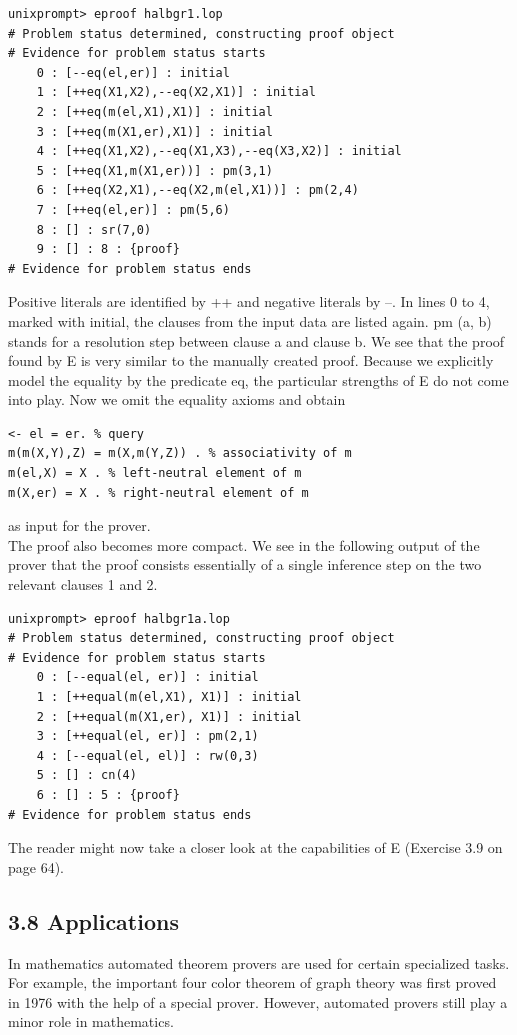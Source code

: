 \documentclass[10pt]{book}
\begin{document}
\begin{verbatim}
unixprompt> eproof halbgr1.lop
# Problem status determined, constructing proof object
# Evidence for problem status starts
    0 : [--eq(el,er)] : initial
    1 : [++eq(X1,X2),--eq(X2,X1)] : initial
    2 : [++eq(m(el,X1),X1)] : initial
    3 : [++eq(m(X1,er),X1)] : initial
    4 : [++eq(X1,X2),--eq(X1,X3),--eq(X3,X2)] : initial
    5 : [++eq(X1,m(X1,er))] : pm(3,1)
    6 : [++eq(X2,X1),--eq(X2,m(el,X1))] : pm(2,4)
    7 : [++eq(el,er)] : pm(5,6)
    8 : [] : sr(7,0)
    9 : [] : 8 : {proof}
# Evidence for problem status ends
\end{verbatim}

Positive literals are identified by ++ and negative literals by --. In lines 0 to 4, marked with initial, the clauses from the input data are listed again. pm (a, b) stands for a resolution step between clause a and clause b. We see that the proof found by E is very similar to the manually created proof. Because we explicitly model the equality by the predicate eq, the particular strengths of E do not come into play. Now we omit the equality axioms and obtain

\begin{verbatim}
<- el = er. % query
m(m(X,Y),Z) = m(X,m(Y,Z)) . % associativity of m
m(el,X) = X . % left-neutral element of m
m(X,er) = X . % right-neutral element of m
\end{verbatim}

as input for the prover.\\
The proof also becomes more compact. We see in the following output of the prover that the proof consists essentially of a single inference step on the two relevant clauses 1 and 2.

\begin{verbatim}
unixprompt> eproof halbgr1a.lop
# Problem status determined, constructing proof object
# Evidence for problem status starts
    0 : [--equal(el, er)] : initial
    1 : [++equal(m(el,X1), X1)] : initial
    2 : [++equal(m(X1,er), X1)] : initial
    3 : [++equal(el, er)] : pm(2,1)
    4 : [--equal(el, el)] : rw(0,3)
    5 : [] : cn(4)
    6 : [] : 5 : {proof}
# Evidence for problem status ends
\end{verbatim}

The reader might now take a closer look at the capabilities of E (Exercise 3.9 on page 64).

\subsection*{3.8 Applications}
In mathematics automated theorem provers are used for certain specialized tasks. For example, the important four color theorem of graph theory was first proved in 1976 with the help of a special prover. However, automated provers still play a minor role in mathematics.
\end{document}
